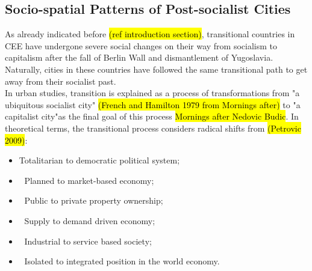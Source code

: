 \documentclass[11pt]{report}
\begin{document}
\subsection{Socio-spatial Patterns of Post-socialist Cities}

As already indicated before \hl{(ref introduction section)}, transitional countries in CEE have undergone severe social changes on their way from socialism to capitalism after the fall of Berlin Wall and dismantlement of Yugoslavia.
Naturally, cities in these countries have followed the same transitional path to get away from their socialist past.
\\
In urban studies, transition is explained as a process of transformations from "a ubiquitous socialist city" \hl{(French and Hamilton 1979 from Mornings after)} to "a capitalist city"as the final goal of this process \hl{Mornings after Nedovic Budic}.
In theoretical terms, the transitional process considers radical shifts from \hl{(Petrovic 2009)}: 
\begin{itemize}
\item Totalitarian to democratic political system;
\item Planned to market-based economy;
\item Public to private property ownership; 
\item Supply to demand driven economy; 
\item Industrial to service based society;
\item Isolated to integrated position in the world economy.
\end{itemize}
\end{document}
